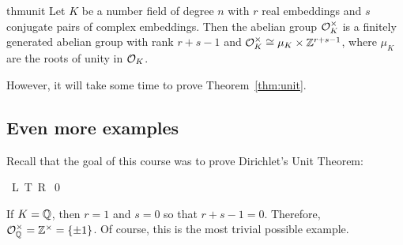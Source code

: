 \begin{restatable*}{thm}{unit} \label{thm:unit}
Let $K$ be a number field of degree $n$ with $r$ real embeddings and $s$ conjugate pairs of complex embeddings. Then the abelian group $\mathcal{O}_K^\times$ is a finitely generated abelian group with rank $r+s-1$ and $\mathcal{O}_K^\times \cong \mu_K \times \mathbb{Z}^{r+s-1}$, where $\mu_K$ are the roots of unity in $\mathcal{O}_K$. 
\end{restatable*}


However, it will take some time to prove Theorem~\ref{thm:unit}.

\subsection{Even more examples}
Recall that the goal of this course was to prove Dirichlet's Unit Theorem:

\unit	%

\pf L.T.R. \qed


\begin{ex}
If $K=\mathbb{Q}$, then $r=1$ and $s=0$ so that $r+s-1=0$. Therefore, $\mathcal{O}_{\mathbb{Q}}^\times=\mathbb{Z}^\times=\{\pm1\}$. Of course, this is the most trivial possible example. \xqed
\end{ex}
